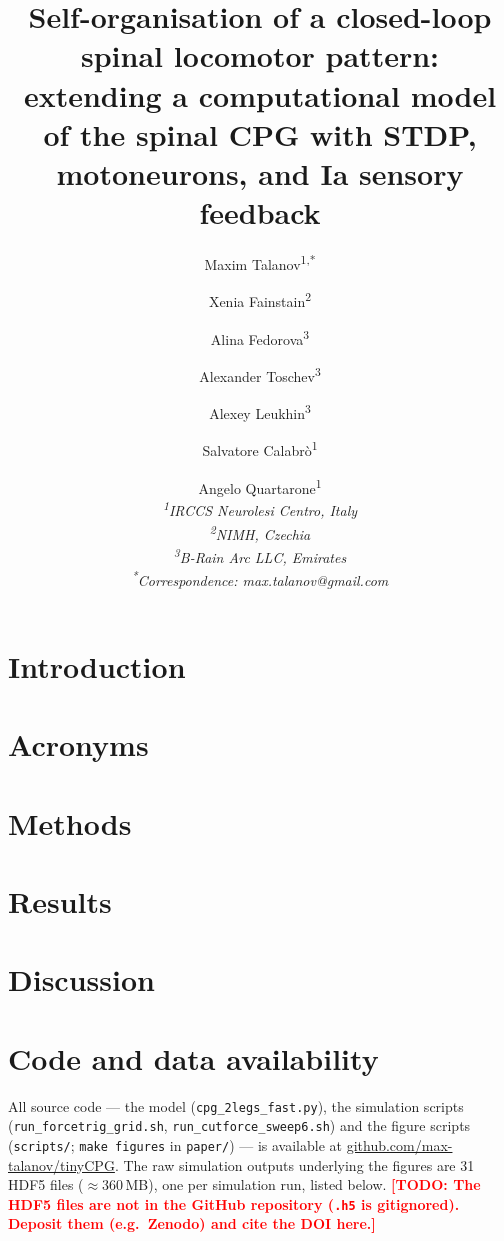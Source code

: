\documentclass[11pt,letterpaper]{article}
\title{Self-organisation of a closed-loop spinal locomotor pattern: \\
       extending a computational model of the spinal CPG with STDP,
       motoneurons, and Ia sensory feedback}
\author{
  Maxim Talanov\textsuperscript{1,*} \and
  Xenia Fainstain\textsuperscript{2} \and
  Alina Fedorova\textsuperscript{3} \and
  Alexander Toschev\textsuperscript{3} \and
  Alexey Leukhin\textsuperscript{3} \and
  Salvatore Calabr\`o\textsuperscript{1} \and
  Angelo Quartarone\textsuperscript{1}
  \\[1em]
  \textit{\small \textsuperscript{1}IRCCS Neurolesi Centro, Italy} \\
  \textit{\small \textsuperscript{2}NIMH, Czechia} \\
  \textit{\small \textsuperscript{3}B-Rain Arc LLC, Emirates} \\
  \textit{\small \textsuperscript{*}Correspondence: max.talanov@gmail.com}
}
\date{}
\newcommand{\todo}[1]{\textcolor{red}{\textbf{[TODO: #1]}}}
\begin{document}
\maketitle



\section{Introduction}\label{sec:intro}


\section{Acronyms}\label{sec:acronyms}


\section{Methods}\label{sec:methods}


\section{Results}\label{sec:results}


\clearpage  %
\section{Discussion}\label{sec:discussion}




\section*{Code and data availability}
All source code --- the model (\texttt{cpg\_2legs\_fast.py}), the simulation
scripts (\texttt{run\_forcetrig\_grid.sh}, \texttt{run\_cutforce\_sweep6.sh}) and
the figure scripts (\texttt{scripts/}; \texttt{make figures} in \texttt{paper/})
--- is available at
\href{https://github.com/max-talanov/tinyCPG}{github.com/max-talanov/tinyCPG}.
The raw simulation outputs underlying the figures are 31 HDF5 files
($\approx360$\,MB), one per simulation run, listed below.%
\todo{The HDF5 files are not in the GitHub repository (\texttt{.h5} is
gitignored). Deposit them (e.g.\ Zenodo) and cite the DOI here.}
\end{document}
